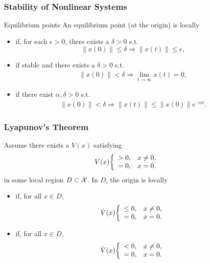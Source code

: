 \begin{frame}
  \frametitle{Stability of Nonlinear Systems}
  \begin{block}{Equilibrium points}
    An equilibrium point (at the origin) is locally
    \begin{itemize}
      \item {} if, for each $\epsilon > 0$, there exists a $\delta > 0$ s.t. $$\|x(0)\| \leq \delta  \Rightarrow \|x(t)\| \leq \epsilon,$$
      \item {} if stable and there exists a $\delta > 0$ s.t.
        \begin{align*}
          \|x(0)\| < \delta \Rightarrow \lim_{t \to \infty} x(t) = 0,
        \end{align*}
      \item {} if there exist $\alpha, \delta > 0$ s.t.
        \begin{align*}
          \|x(0)\| < \delta \Rightarrow \| x(t) \| \leq \| x(0) \| e^{-\alpha t}.
        \end{align*}
    \end{itemize}
  \end{block}
\end{frame}

\begin{frame}
  \frametitle{Lyapunov's Theorem}
  Assume there exists a  $V(x)$ satisfying
  \begin{align*}
    V(x) \bigg\{\begin{array}{l l}
      > 0,& x \ne 0,\\
      = 0,& x = 0.
    \end{array}
  \end{align*}
  in some local region $D \subset \mathcal{X}$. In $D$, the origin is locally
  \begin{itemize}
  \item {} if, for all $x \in D$,
    \begin{align*}
      {\dot V}(x) \bigg\{\begin{array}{l l}
      \leq 0,& x \ne 0,\\
      = 0,& x = 0.
      \end{array}
    \end{align*}
  \item {} if, for all $x \in D$,
    \begin{align*}
      {\dot V}(x) \bigg\{\begin{array}{l l}
      < 0,& x \ne 0,\\
      = 0,& x = 0.
      \end{array}
    \end{align*}
  \end{itemize}
\end{frame}


